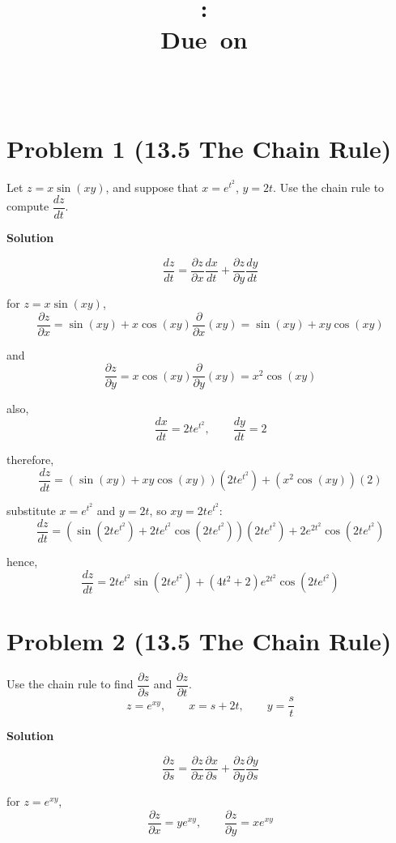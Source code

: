 \documentclass{article}
\title{
    \vspace{2in}
    \textmd{\textbf{\hmwkClass:\ \hmwkTitle}}\\
    \normalsize\vspace{0.1in}\small{Due\ on\ \hmwkDueDate}\\
    \vspace{0.1in}\large{\textit{\hmwkClassInstructor\ \hmwkClassTime}}
    \vspace{3in}
}
\author{\hmwkAuthorName}
\date{}
\newcommand{\solution}{\textbf{\large Solution}}
\theoremstyle{remark}
\begin{document}
\maketitle
\newpage

\section*{Problem 1 (13.5 The Chain Rule)}
Let $z = x\sin(xy)$, and suppose that $x = e^{t^2}$, $y = 2t$. Use the chain rule to compute $\dfrac{dz}{dt}$.

\medskip
\solution

\[
    \frac{dz}{dt} = \frac{\partial z}{\partial x}\frac{dx}{dt} + \frac{\partial z}{\partial y}\frac{dy}{dt}
\]

for $z = x\sin(xy)$,
\[
    \frac{\partial z}{\partial x} = \sin(xy) + x\cos(xy)\frac{\partial}{\partial x}(xy)
    = \sin(xy) + xy\cos(xy)
\]

and
\[
    \frac{\partial z}{\partial y} = x\cos(xy)\frac{\partial}{\partial y}(xy) = x^2\cos(xy)
\]

also,
\[
    \frac{dx}{dt} = 2te^{t^2}, \qquad \frac{dy}{dt} = 2
\]

therefore,
\[
    \frac{dz}{dt} = \left(\sin(xy) + xy\cos(xy)\right)(2te^{t^2}) + \left(x^2\cos(xy)\right)(2)
\]

substitute $x = e^{t^2}$ and $y = 2t$, so $xy = 2te^{t^2}$:
\[
    \frac{dz}{dt} = \left(\sin(2te^{t^2}) + 2te^{t^2}\cos(2te^{t^2})\right)(2te^{t^2}) + 2e^{2t^2}\cos(2te^{t^2})
\]

hence,
\[
    \boxed{\frac{dz}{dt} = 2te^{t^2}\sin(2te^{t^2}) + (4t^2+2)e^{2t^2}\cos(2te^{t^2})}
\]

\vspace{1em}
\hrulefill

\section*{Problem 2 (13.5 The Chain Rule)}
Use the chain rule to find $\dfrac{\partial z}{\partial s}$ and $\dfrac{\partial z}{\partial t}$.
\[
    z = e^{xy}, \qquad x = s + 2t, \qquad y = \frac{s}{t}
\]

\medskip
\solution

\[
    \frac{\partial z}{\partial s} = \frac{\partial z}{\partial x}\frac{\partial x}{\partial s} + \frac{\partial z}{\partial y}\frac{\partial y}{\partial s}
\]

for $z = e^{xy}$,
\[
    \frac{\partial z}{\partial x} = ye^{xy}, \qquad \frac{\partial z}{\partial y} = xe^{xy}
\]
\end{document}
